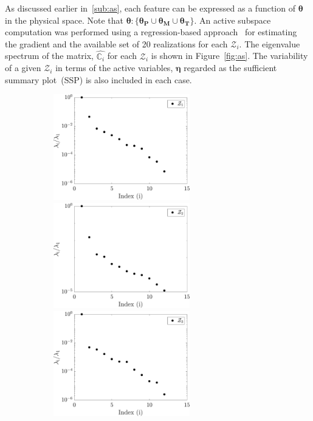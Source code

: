 As discussed earlier in~\ref{sub:as}, each feature can be expressed as a function of $\bm{\theta}$ in the physical
space. Note that $\bm{\theta}:\{\bm{\theta_P}\cup\bm{\theta_M}\cup\bm{\theta_T}\}$. An active subspace computation
was performed using a regression-based approach~\cite{Constantine:2015, Vohra:2019}
for estimating the gradient and the available set of 20 realizations for each $\mathcal{Z}_i$. 
The eigenvalue spectrum of the matrix, $\hat{\mathbb{C}_i}$ for each $\mathcal{Z}_i$ is shown in Figure~\ref{fig:as}.
The variability of a given $\mathcal{Z}_i$ in terms of the active variables, $\bm{\eta}$ regarded as the sufficient summary
plot~(SSP) is also included in each case.
%
\begin{figure}[htbp]
\begin{center}
\begin{subfigure}{0.35\textwidth}
\includegraphics[width=0.65\textwidth]{./Figures/eig_Zf1} 
\\
\includegraphics[width=0.65\textwidth]{./Figures/eig_Zf2} 
\\
\includegraphics[width=0.65\textwidth]{./Figures/eig_Zf3} 

\end{subfigure}
\end{center}
\end{figure}
